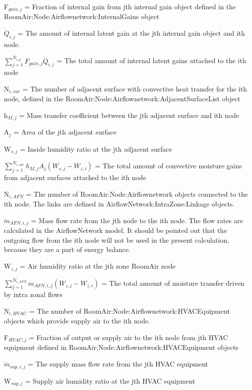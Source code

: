 F\(_{gain,j}\) = Fraction of internal gain from jth internal gain object defined in the RoomAir:Node:Airflownetwork:InternalGains object

\({\dot Q}_{i,j}\) = The amount of internal latent gain at the jth internal gain object and ith node.

\({\sum\limits_{j = 1}^{N_{i,g}} F_{gain,j}{\dot Q}_{i,j}}\) = The total amount of internal latent gains attached to the ith node

N\(_{i,sur}\) = The number of adjacent surface with convective heat transfer for the ith node, defined in the RoomAir:Node:Airflownetwork:AdjacentSurfaceList object

h\(_{M,j}\) = Mass transfer coefficient between the jth adjacent surface and ith node

A\(_{j}\) = Area of the jth adjacent surface

W\(_{s,j}\) = Inside humidity ratio at the jth adjacent surface

\({\sum\limits_{j = 1}^{N_{i,sur}} h_{M,j} A_j \left( W_{s,j} - W_{z,i}\right)}\) = The total amount of convective moisture gains from adjacent surfaces attached to the ith node

N\(_{i,AFN}\) = The number of RoomAir:Node:Airflownetwork objects connected to the ith node. The links are defined in AirflowNetwork:IntraZone:Linkage objects.

\({\dot m}_{AFN,i,j}\) = Mass flow rate from the jth node to the ith node. The flow rates are calculated in the AirflowNetwork model. It should be pointed out that the outgoing flow from the ith node will not be used in the present calculation, because they are a part of energy balance.

W\(_{z,j}\) = Air humidity ratio at the jth zone RoomAir node

\({\sum\limits_{j = 1}^{N_{i,AFN}} \dot m_{AFN,i,j} \left( W_{z,j} - W_{z,i}\right)}\) = The total amount of moisture transfer driven by intra zonal flows

N\(_{i,HVAC}\) = The number of RoomAir:Node:Airflownetwork:HVACEquipment objects which provide supply air to the ith node.

F\(_{HVAC,j}\) = Fraction of output or supply air to the ith node from jth HVAC equipment defined in RoomAir:Node:Airflownetwork:HVACEquipment objects

\({\dot m}_{sup,i,j}\) = The supply mass flow rate from the jth HVAC equipment

W\(_{sup,j}\) = Supply air humidity ratio at the jth HVAC equipment

